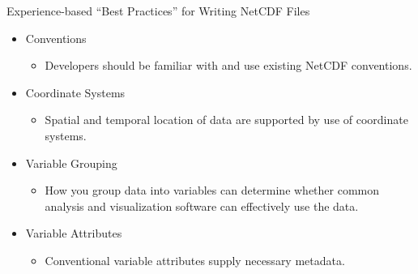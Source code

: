 \documentclass[compress,11pt,xcolor=svgnames,aspectratio=169]{beamer}
\begin{document}
\begin{frame}[t]{Experience-based ``Best Practices'' for Writing NetCDF Files}

    \begin{itemize}
    \setlength\itemsep{0.3cm}

        \item	Conventions
        \begin{itemize}
          \item Developers should be familiar with and use existing NetCDF conventions.
        \end{itemize}

        \item	Coordinate Systems
        \begin{itemize}
          \item Spatial and temporal location of data are supported by use of coordinate systems.
        \end{itemize}

        \item	Variable Grouping
        \begin{itemize}
          \item How you group data into variables can determine whether common analysis and visualization software can effectively use the data.
        \end{itemize}

        \item	Variable Attributes
        \begin{itemize}
          \item Conventional variable attributes supply necessary metadata.
        \end{itemize}

    \end{itemize}

\end{frame}
\end{document}
